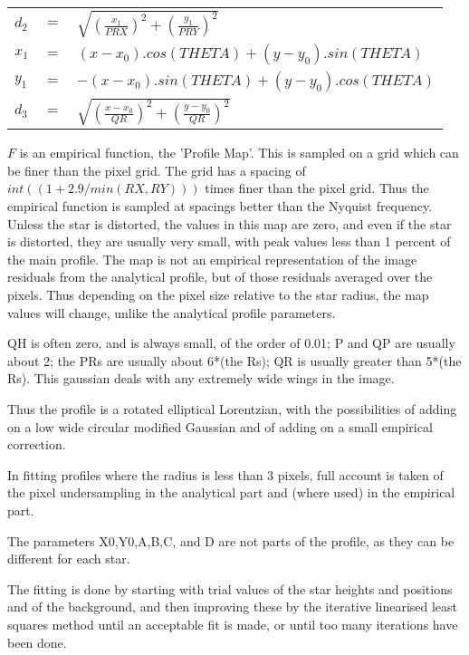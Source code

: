 {{\begin{tabular}{l l l}
$ d_{2} $&$=$&$ \sqrt{\left(\frac{x_{1}}{PRX}\right)^2+\left(\frac{y_{1}}{PRY}\right)^2}$\\ 
$x_{1} $&$=$&$ (x-x_{0}).cos(THETA) + (y-y_{0}).sin(THETA)$ \\
$y_{1} $&$=$&$ -(x-x_{0}).sin(THETA) + (y-y_{0}).cos(THETA)$ \\ 
$d_{3} $&$=$&$\sqrt{\left(\frac{x-x_{0}}{QR}\right)^2+\left(\frac{y-y_{0}}{QR}\right)^2}$ \\

\end{tabular}

$F$  is an empirical function, the 'Profile Map'. This is
sampled on a grid which can be finer than the pixel
grid. The grid has a spacing of $int((1 + 2.9/min(RX,RY)))$
times finer than the pixel grid. Thus the empirical
function is sampled at spacings better than the Nyquist frequency.
Unless the star is distorted, the values in this map are zero, and 
even if the star is distorted, they are usually very 
small, with peak values less than 1 percent of the 
main profile. The map is not an empirical representation of the image
residuals from the analytical profile, but of those residuals averaged
over the pixels. Thus depending on the pixel size relative to the star
radius, the map values will change, unlike the analytical profile
parameters.

QH is often zero, and is always small, of the order of 0.01; 
P and QP are usually about 2; the PRs are usually about 6*(the Rs);
QR is usually greater than 5*(the Rs). This gaussian deals with 
any extremely wide wings in the image.


Thus the profile is a rotated elliptical Lorentzian, with the possibilities
of adding on a low wide circular modified Gaussian and of adding on a
small empirical correction.

In fitting profiles where the radius is less than 3 pixels, full account
is taken of the pixel undersampling in the analytical part and (where used) 
in the empirical part.
                                                                               
 The parameters X0,Y0,A,B,C, and D are not parts of the profile, as
 they can be different for each star.
                                                                               
 The fitting is done by starting with trial values of the star heights
 and positions and of the background, and then improving these by the
 iterative linearised least squares method until an acceptable fit is
 made, or until too many iterations have been done.
                                                                               
}}

